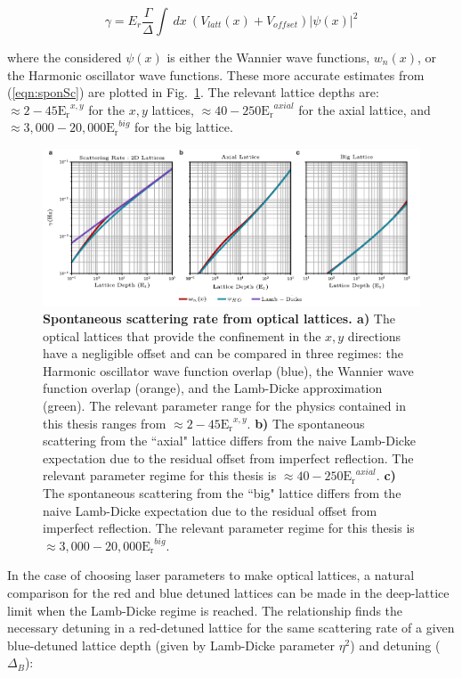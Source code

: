 \begin{equation}
\gamma=E_r \frac{\Gamma}{\Delta} \int~dx~ \left ( V_{latt}(x) + V_{offset} \right ) |\psi(x)|^2
\label{eqn:sponSc}
\end{equation}

where the considered $\psi(x)$ is either the Wannier wave functions, $w_n(x)$, or the Harmonic oscillator wave functions. These more accurate estimates from (\ref{eqn:sponSc}) are plotted in Fig.~\ref{fig:heating}. The relevant lattice depths are: $\approx 2-45\mathrm{E_r}^{x,y}$ for the $x,y$ lattices, $\approx 40-250 \mathrm{E_r}^{axial}$ for the axial lattice, and $\approx 3,000-20,000 \mathrm{E_r}^{big}$ for the big lattice.

\begin{figure}[t!]
		\includegraphics[width=\columnwidth]{figures/ch2/heating_rates/ScatteringRatesv2edit.pdf} 
		\caption{\textbf{Spontaneous scattering rate from optical lattices. a)} The optical lattices that provide the confinement in the $x,y$ directions have a negligible offset and can be compared in three regimes: the Harmonic oscillator wave function overlap (blue), the Wannier wave function overlap (orange), and the Lamb-Dicke approximation (green). The relevant parameter range for the physics contained in this thesis ranges from $\approx 2-45\mathrm{E_r}^{x,y}$. \textbf{b)} The spontaneous scattering from the ``axial" lattice differs from the naive Lamb-Dicke expectation due to the residual offset from imperfect reflection. The relevant parameter regime for this thesis is $\approx 40-250 \mathrm{E_r}^{axial}$. \textbf{c)} The spontaneous scattering from the ``big" lattice differs from the naive Lamb-Dicke expectation due to the residual offset from imperfect reflection. The relevant parameter regime for this thesis is $\approx 3,000-20,000 \mathrm{E_r}^{big}$.}
		\label{fig:heating}	
\end{figure}

In the case of choosing laser parameters to make optical lattices, a natural comparison for the red and blue detuned lattices can be made in the deep-lattice limit when the Lamb-Dicke regime is reached. The relationship finds the necessary detuning in a red-detuned lattice for the same scattering rate of a given blue-detuned lattice depth (given by Lamb-Dicke parameter $\eta^2$) and detuning ($\Delta_B$):

